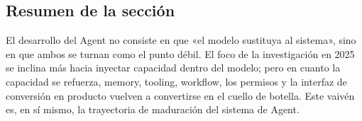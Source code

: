 \subsection{Resumen de la sección}
El desarrollo del Agent no consiste en que «el modelo sustituya al sistema», sino en que ambos se turnan como el punto débil. El foco de la investigación en 2025 se inclina más hacia inyectar capacidad dentro del modelo; pero en cuanto la capacidad se refuerza, memory, tooling, workflow, los permisos y la interfaz de conversión en producto vuelven a convertirse en el cuello de botella. Este vaivén es, en sí mismo, la trayectoria de maduración del sistema de Agent.

